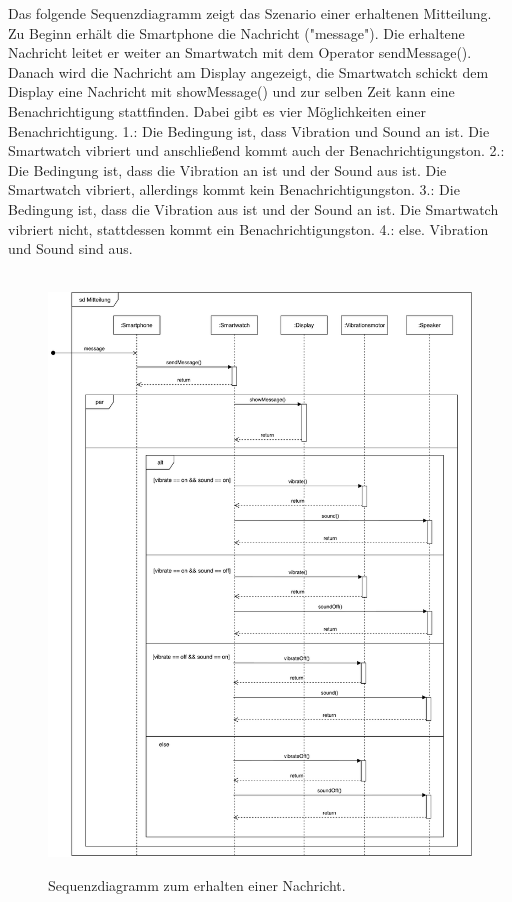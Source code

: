 Das folgende Sequenzdiagramm zeigt das Szenario einer erhaltenen Mitteilung. Zu Beginn erhält die Smartphone die Nachricht ("message"). Die erhaltene Nachricht leitet er weiter an Smartwatch mit dem Operator sendMessage(). Danach wird die Nachricht am Display angezeigt, die Smartwatch schickt dem Display eine Nachricht mit showMessage() und zur selben Zeit kann eine Benachrichtigung stattfinden. Dabei gibt es vier Möglichkeiten einer Benachrichtigung.
1.: Die Bedingung ist, dass Vibration und Sound an ist. Die Smartwatch vibriert und anschließend kommt auch der Benachrichtigungston.
2.: Die Bedingung ist, dass die Vibration an ist und der Sound aus ist. Die Smartwatch vibriert, allerdings kommt kein Benachrichtigungston.
3.: Die Bedingung ist, dass die Vibration aus ist und der Sound an ist. Die Smartwatch vibriert nicht, stattdessen kommt ein Benachrichtigungston.
4.: else. Vibration und Sound sind aus.

\begin{figure}[H]
\centering\
\includegraphics[width=\textwidth]{img/seqMessage}
\caption{Sequenzdiagramm zum erhalten einer Nachricht.}\label{fig:seqMessage}
\end{figure}
